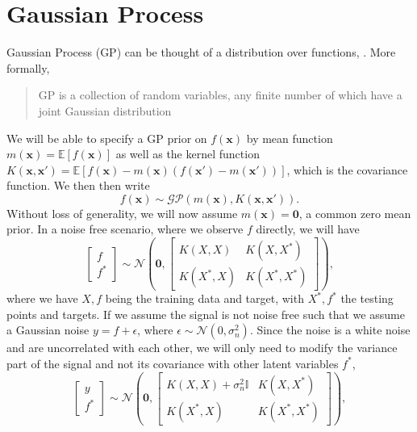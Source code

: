 \documentclass{statsmsc}
\begin{document}
\section{Gaussian Process}
Gaussian Process (GP) can be thought of a distribution over functions, \cite{rasmussen_williams_2006}.
More formally, \begin{quote}GP is a collection of random variables, any finite number of which have a joint Gaussian distribution\end{quote}
We will be able to specify a GP prior on $f(\mathbf{x})$ by mean function $m(\mathbf{x})=\mathbb{E}[f(\mathbf{x})]$ as well as the kernel function $K(\mathbf{x}, \mathbf{x'})=\mathbb{E}[f(\mathbf{x})-m(\mathbf{x})(f(\mathbf{x'})-m(\mathbf{x'}))]$, which is the covariance function.
We then then write
$$
f(\mathbf{x})\sim\mathcal{GP}(m(\mathbf{x}),K(\mathbf{x},\mathbf{x'})).
$$
Without loss of generality, we will now assume $m(\mathbf{x})=\mathbf{0}$, a common zero mean prior.
In a noise free scenario, where we observe $f$ directly, we will have
$$
\begin{bmatrix}
  f\\f^*
\end{bmatrix}
\sim \mathcal{N}
\left(\mathbf{0}, \begin{bmatrix}K(X, X) & K(X, X^*) \\ K(X^*, X) & K(X^*, X^*) \end{bmatrix}\right),
$$
where we have $X, f$ being the training data and target, with $X^*, f^*$ the testing points and targets.
If we assume the signal is not noise free such that we assume a Gaussian noise $y=f+\epsilon$, where $\epsilon\sim\mathcal{N}(0, \sigma_n^2)$.
Since the noise is a white noise and are uncorrelated with each other, we will only need to modify the variance part of the signal and not its covariance with other latent variables $f^*$,
\begin{equation}
\begin{bmatrix}
  y\\f^*
\end{bmatrix}
\sim \mathcal{N}
\left(\mathbf{0}, \begin{bmatrix}K(X, X)+\sigma^2_n\mathbb{I} & K(X, X^*) \\ K(X^*, X) & K(X^*, X^*) \end{bmatrix}\right),
\label{equ:joint_gp_noise}
\end{equation}
\end{document}

